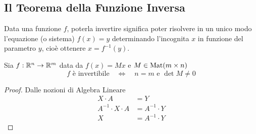 \subsection{Il Teorema della Funzione Inversa}
Data una funzione $f$, poterla invertire significa poter risolvere in un unico modo l'equazione (o sistema) $f(x) = y$ determinando l'incognita $x$ in funzione del parametro $y$, cioè ottenere $x = f^{-1}(y)$.
\begin{theorem}
	Sia $f: \mathbb{R}^n \to \mathbb{R}^m$ data da $f(x) = Mx$ e $ M \in \operatorname{Mat}(m\times n)$
	\[f \text{ è invertibile} \quad \iff \quad n = m \text{ e } \det M \ne 0\]
	\begin{proof}
		Dalle nozioni di Algebra Lineare
		\begin{align*}
			X \cdot A &= Y\\
			A^{-1} \cdot X \cdot A &= A^{-1} \cdot Y\\
			X &= A^{-1} \cdot Y
		\end{align*}
	\end{proof}
\end{theorem}
